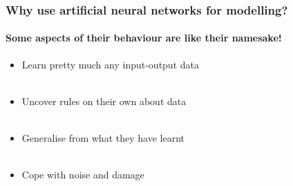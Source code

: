 \documentclass{beamer}
\begin{document}
\begin{frame}
\frametitle{Why use artificial neural networks for modelling?}
\framesubtitle{Some aspects of their behaviour are like their namesake!}
\begin{itemize}[<+->]
\item Learn pretty much any input-output data \\ \
 \item Uncover rules on their own about data  \\ \
\item Generalise from what they have learnt \\ \
\item Cope with noise and damage \\ \
\end{itemize}
\end{frame}
\end{document}
